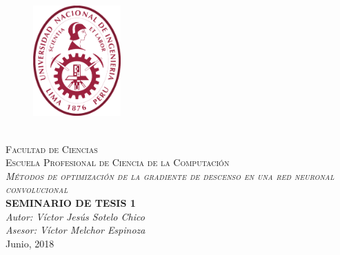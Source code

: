 \documentclass[12pt,spanish, singlespacing,]{MastersDoctoralThesis}
\author{}
\newcommand\blankpage{%
    \null
    \thispagestyle{empty}%
    \addtocounter{page}{0}%
    \newpage}
\begin{document}
\frontmatter 
\pagestyle{plain} 
\begin{titlepage}
\begin{center}

\begin{figure}[h]
\centering
\includegraphics[width=0.3\textwidth]{Figures/log_uni.png}
\end{figure}

\textsc{\huge \univname}\\[0.3cm]
\textsc{\Large Facultad de Ciencias}\\[0.2cm]
\textsc{\large Escuela Profesional de Ciencia de la Computaci\'on}\\[2cm]
\textsc{\LARGE \textit{Métodos de optimización de la gradiente de descenso en una red neuronal convolucional}}\\[2cm] 
{\Large \textbf{SEMINARIO DE TESIS 1}}
{\huge \bfseries \ttitle}\\[2cm] 

\bigskip
\bigskip
\large\emph{Autor: Víctor Jesús Sotelo Chico}
{\authorname}\\ 
\large\emph{Asesor: Víctor Melchor Espinoza}
{\supname} 
\\[1cm]
{\large Junio, 2018}\\[4cm] 
 
\vfill
\end{center}
\end{titlepage}
\afterpage{\blankpage}
\end{document}
